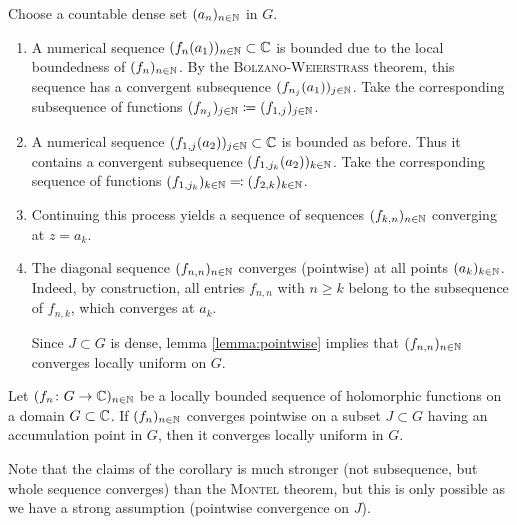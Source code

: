 \documentclass[a4paper,english]{article}
\begin{document}
\begin{pr}
     Choose a countable dense set $(a_n)_{n \in \operatorname{\mathbb{N}}}$ in $G$.
    \begin{enumerate}
        \item 
        A numerical sequence $(f_n(a_1))_{n \in \operatorname{\mathbb{N}}} \subset \operatorname{\mathbb{C}}$ is bounded due to the local boundedness of $(f_n)_{n \in \operatorname{\mathbb{N}}}$.
        By the  \textsc{Bolzano-Weierstrass} theorem, this sequence has a convergent subsequence $(f_{n_j}(a_1))_{j \in \operatorname{\mathbb{N}}}$.
        Take the corresponding subsequence of functions $(f_{n_j})_{j \in \operatorname{\mathbb{N}}} \coloneqq (f_{1, j})_{j \in \operatorname{\mathbb{N}}}$.
        
        \item
        A numerical sequence $(f_{1,j}(a_2))_{j \in \operatorname{\mathbb{N}}} \subset \operatorname{\mathbb{C}}$ is bounded as before.
        Thus it contains a convergent subsequence $(f_{1, j_k}(a_2))_{k \in \operatorname{\mathbb{N}}}$.
        Take the corresponding sequence of functions $(f_{1, j_k})_{k \in \operatorname{\mathbb{N}}} \eqqcolon (f_{2, k})_{k \in \operatorname{\mathbb{N}}}$.
        
        \item
        Continuing this process yields a sequence of sequences $(f_{k, n})_{n \in \operatorname{\mathbb{N}}}$ converging at $z = a_k$.
        
        \item
        The diagonal sequence $(f_{n, n})_{n \in \operatorname{\mathbb{N}}}$ converges (pointwise) at all points $(a_k)_{k \in \operatorname{\mathbb{N}}}$.
        Indeed, by construction, all entries $f_{n, n}$ with $n \ge k$ belong to the subsequence of $f_{n, k}$, which converges at $a_k$.
        
        Since $J \subset G$ is dense, lemma \ref{lemma:pointwise} implies that $(f_{n, n})_{n \in \operatorname{\mathbb{N}}}$ converges locally uniform on $G$.
    \end{enumerate}
\end{pr}

\begin{cor}
    Let $(f_n \colon G \to \operatorname{\mathbb{C}})_{n \in \operatorname{\mathbb{N}}}$ be a locally bounded sequence of holomorphic functions on a domain $G \subset \operatorname{\mathbb{C}}$.
    If $(f_n)_{n \in \operatorname{\mathbb{N}}}$ converges pointwise on a subset $J \subset G$ having an accumulation point in $G$, then it converges locally uniform in $G$.
\end{cor}

Note that the claims of the corollary is much stronger (not subsequence, but whole sequence converges) than the \textsc{Montel} theorem, but this is only possible as we have a strong assumption (pointwise convergence on $J$).
\end{document}
